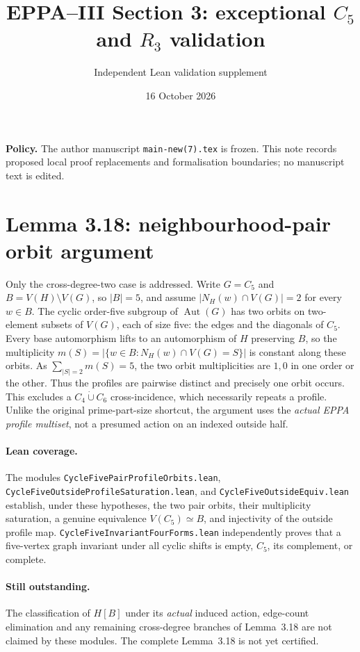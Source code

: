 \documentclass[11pt,a4paper]{article}
\title{EPPA--III Section 3: exceptional \(C_5\) and \(R_3\) validation}
\author{Independent Lean validation supplement}
\date{16 October 2026}
\begin{document}
\maketitle
\noindent\textbf{Policy.} The author manuscript
\texttt{main-new(7).tex} is frozen. This note records
proposed local proof replacements and formalisation
boundaries; no manuscript text is edited.

\section*{Lemma 3.18: neighbourhood-pair orbit argument}
Only the cross-degree-two case is addressed.
Write \(G=C_5\) and \(B=V(H)\setminus V(G)\), so
\(|B|=5\), and assume \(|N_H(w)\cap V(G)|=2\) for
every \(w\in B\). The cyclic order-five subgroup of
\(\operatorname{Aut}(G)\) has two orbits on two-element
subsets of \(V(G)\), each of size five:
the edges and the diagonals of \(C_5\).
Every base automorphism lifts to an automorphism of
\(H\) preserving \(B\), so the multiplicity
\(m(S)=|\{w\in B:N_H(w)\cap V(G)=S\}|\) is constant
along these orbits.
As \(\sum_{|S|=2}m(S)=5\), the two orbit multiplicities
are \(1,0\) in one order or the other.
Thus the profiles are pairwise distinct and precisely
one orbit occurs. This excludes a \(C_4\dot\cup C_6\)
cross-incidence, which necessarily repeats a profile.
Unlike the original prime-part-size shortcut, the
argument uses the \emph{actual EPPA profile multiset},
not a presumed action on an indexed outside half.

\paragraph{Lean coverage.}
The modules \texttt{CycleFivePairProfileOrbits.lean},
\texttt{CycleFiveOutsideProfileSaturation.lean}, and
\texttt{CycleFiveOutsideEquiv.lean} establish, under
these hypotheses, the two pair orbits, their multiplicity
saturation, a genuine equivalence
\(V(C_5)\simeq B\), and injectivity of the outside profile
map. \texttt{CycleFiveInvariantFourForms.lean}
independently proves that a five-vertex graph invariant
under all cyclic shifts is empty, \(C_5\), its
complement, or complete.

\paragraph{Still outstanding.}
The classification of \(H[B]\) under its
\emph{actual} induced action, edge-count elimination
and any remaining cross-degree branches of Lemma~3.18
are not claimed by these modules. The complete
Lemma~3.18 is not yet certified.
\end{document}
